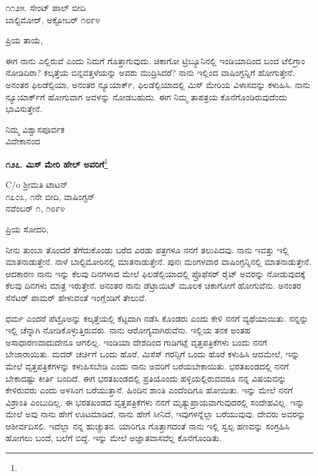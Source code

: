 \vspace{-0.5cm}

\begin{flushright}
೧೧೨೫. ಸೇಂಟ್ ಪಾಲ್ ಬೀದಿ\\ಬಾಲ್ಟಿಮೋರ್‌, ಅಕ್ಟೋಬರ್ ೧೮೯೪
\end{flushright}

\vspace{-0.5cm}

\noindent
ಪ್ರಿಯ ತಾಯೆ,

ಈಗ ನಾನು ಎಲ್ಲಿರುವೆ ಎಂದು ನಿಮಗೆ ಗೊತ್ತಾಗುವುದು. ಚಿಕಾಗೋ ಟ್ರಿಬ್ಯೂನಿನಲ್ಲಿ ಇಂಡಿಯಾದಿಂದ ಬಂದ ಟೆಲಿಗ್ರಾಂ ನೋಡಿದಿರಾ? ಕಲ್ಕತ್ತೆಯ ಬಿನ್ನವತ್ತಳೆಯನ್ನು ಅವರು ಮುದ್ರಿಸಿದರೆ? ನಾನು ಇಲ್ಲಿಂದ ವಾಷಿಂಗ್ಟನ್ನಿಗೆ ಹೋಗುತ್ತೇನೆ. ಅನಂತರ ಫಿಲಡೆಲ್ಪಿಯಾ, ಅನಂತರ ನ್ಯೂಯಾರ್ಕ್, ಫಿಲಡೆಲ್ಪಿಯಾದಲ್ಲಿ ಮಿಸ್ ಮೇರಿಯ ವಿಳಾಸವನ್ನು ಕಳುಹಿಸಿ. ನಾನು ನ್ಯೂಯಾರ್ಕ್‌ಗೆ ಹೋಗುವಾಗ ಅವಳನ್ನು ನೋಡಬಹುದು. ಈಗ ನಿಮ್ಮ ತಾಪತ್ರಯ ಕೊನೆಗೊಂಡಿರುವುದೆಂದು ಭಾವಿಸುತ್ತೇನೆ.

\vspace{-0.5cm}

{\flushright
ನಿಮ್ಮ ವಿಶ್ವಾಸಪೂರ್ವಕ\\ವಿವೇಕಾನಂದ\par}

\begin{center}
\textbf{೧೨೭. ಮಿಸ್ ಮೇರಿ ಹೇಲ್‌ ಅವರಿಗೆ}\footnote{}
\end{center}

\begin{flushright}
C/o ಶ‍್ರೀಮತಿ ಟಾಟನ್\\೧೭೦೩, ೧ನೇ ಬೀದಿ, ವಾಷಿಂಗ್ಟನ್\\ನವೆಂಬರ್ ೧, ೧೮೯೪
\end{flushright}

\noindent
ಪ್ರಿಯ ಸೋದರಿ,

ನೀನು ತುಂಬಾ ತೊಂದರೆ ತೆಗೆದುಕೊಂಡು ಬರೆದ ಎರಡು ಪತ್ರಗಳೂ ನನಗೆ ತಲುಪಿದವು. ನಾನು ಇವತ್ತು ಇಲ್ಲಿ ಮಾತನಾಡುತ್ತೇನೆ. ನಾಳೆ ಬಾಲ್ಟಿಮೋರಿನಲ್ಲಿ ಮಾತನಾಡುತ್ತೇನೆ. ಪುನಃ ಮಂಗಳವಾರ ವಾಷಿಂಗ್ಟನ್ನಿನಲ್ಲಿ ಮಾತನಾಡುತ್ತೇನೆ. ಆದಕಾರಣ ನಾನು ಇನ್ನು ಕೆಲವು ದಿನಗಳಾದ ಮೇಲೆ ಫಿಲಡೆಲ್ಫಿಯಾದಲ್ಲಿ ಪ್ರೊಫೆಸರ್ ರೈಟ್ ಅವರನ್ನು ನೋಡುವುದಕ್ಕೆ ಕೆಲವು ದಿನಗಳು ಮಾತ್ರ ಇರುತ್ತೇನೆ. ಅನಂತರ ನಾನು ಡೆಟ್ರಾಯಿಟ್ ಮೂಲಕ ಚಿಕಾಗೋಗೆ ಹೋಗುವೆನು. ಅನಂತರ ಸೆನೆಟರ್ ಪಾಮರ್ ಹೇಳುವಂತೆ ಇಂಗ್ಲೆಂಡಿಗೆ ತೇಲುವೆ.

ಧರ್ಮ ಎಂದರೆ  ಪೆಟ್ರೊಅನ್ನು ಕಲ್ಕತ್ತೆಯಲ್ಲಿ ಕೆಟ್ಟದಾಗಿ ನಡೆಸಿ ಕೊಂಡರು ಎಂದು ಕೇಳಿ ನನಗೆ ವ್ಯಥೆಯಾಯಿತು. ನನ್ನನ್ನು ಇಲ್ಲಿ ಚೆನ್ನಾಗಿ ನೋಡಿಕೊಳ್ಳುತ್ತಿರುವರು. ನಾನು ಆರೋಗ್ಯವಾಗಿರುವೆನು. ಇಲ್ಲಿಯ ತನಕ ಅಂತಹ ಅಸಾಧಾರಣವಾದುದೇನೂ ಆಗಲಿಲ್ಲ. ಇಂಡಿಯಾ ದೇಶದಿಂದ ಗಾಡಿಗಟ್ಲೆ ವೃತ್ತಪತ್ರಿಕೆಗಳು ಬಂದು ನನಗೆ ಬೇಜಾರಾಯಿತು. ಮದರ್‌ ಚರ್ಚಿಗೆ ಒಂದು ಹೊರೆ, ಮಿಸೆಸ್ ಗರನ್ಸಿಗೆ ಒಂದು ಹೊರೆ ಕಳುಹಿಸಿ ಆದಮೇಲೆ, ಇನ್ನು ಮೇಲೆ ವೃತ್ತಪತ್ರಿಕೆಗಳನ್ನು ಕಳುಹಿಸಬೇಡಿ ಎಂದು ನಾನು ಅವರಿಗೆ ಬರೆಯಬೇಕಾಯಿತು. ಭರತಖಂಡದಲ್ಲಿ ನನಗೆ ಬೇಕಾದಷ್ಟು ಕೀರ್ತಿ ಬಂದಿದೆ. ಈಗ ಭರತಖಂಡದಲ್ಲಿ ಪ್ರತಿಯೊಂದು ಹಳ್ಳಿಯಲ್ಲಿರುವವರೂ ನನ್ನ ವಿಷಯವನ್ನು ಕೇಳಿರುವರು ಎಂದು ಅಳಸಿಂಗ ಬರೆಯುತ್ತಾನೆ. ಹಿಂದಿನ ಶಾಂತಿ ಎಂದೆಂದಿಗೂ ಹೋಯಿತು. ಇನ್ನು ಮೇಲೆ ನನಗೆ ವಿಶ್ರಾಂತಿ ಎಂಬುದಿಲ್ಲ. ಈ ಭರತಖಂಡದ ವೃತ್ತಪತ್ರಿಕೆಗಳು ನನಗೆ ಮೃತ್ಯುಪ್ರಾಯವಾಗುವುದರಲ್ಲಿ ಸಂದೇಹವಿಲ್ಲ. ಇನ್ನು ಮೇಲೆ ಅವು ನಾನು ಹೇಗೆ ಊಟಮಾಡಿದೆ, ನಾನು ಹೇಗೆ ಸೀನಿದೆ, ಇವುಗಳನ್ನೆಲ್ಲಾ ಬರೆಯುವುವು. ದೇವರು ಅವರನ್ನು ಆಶೀರ್ವದಿಸಲಿ. ಇದೆಲ್ಲಾ ನನ್ನ ಹುಚ್ಚುತನ. ಯಾರಿಗೂ ಗೊತ್ತಾಗದಂತೆ ನಾನು ಇಲ್ಲಿ ಸ್ವಲ್ಪ ಹಣವನ್ನು ಸಂಗ್ರಹಿಸಿ ಹೋಗಲು ಬಂದೆ, ಬಲೆಗೆ ಬಿದ್ದೆ. ಇನ್ನು ಮೇಲೆ ಅಜ್ಞಾತವಾಸವೆಲ್ಲ ಕೊನೆಗೊಂಡಿತು.

